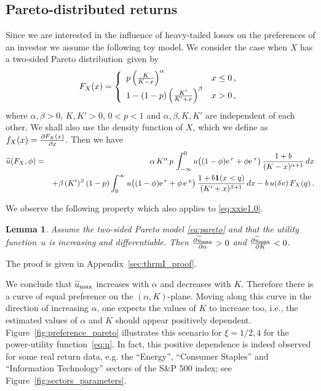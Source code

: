 \documentclass[11pt,a4]{amsart}
\newcommand{\pd}{\partial}
\newcommand{\ex}{{\rm e}\,}
\newtheorem{lemma}{Lemma}[section]
\newcommand{\ble}{\begin{lemma}}
\newcommand{\ele}{\end{lemma}}
\newcommand{\beam}{\begin{eqnarray}}
\newcommand{\eeam}{\end{eqnarray}\noindent}
\newcommand{\wt}{\widetilde}
\newcommand{\fct}{function}
\newcommand{\ds}{distribution}
\newcommand{\1}{{\mathbf 1}}
\begin{document}
\subsection{Pareto-distributed returns}\label{sec:pareto_tail}
Since we are interested in the influence of heavy-tailed losses on the preferences of an investor 
we assume the following toy model. 
We consider the case when $X$ has a two-sided Pareto \ds\ given by
\beam\label{eq:pareto}
  F_X(x) = \left\{
  \begin{array}{ll}
    p \left(
    {K \over K - x}
    \right)^\alpha & x \leq 0 \,,\\
    1 - (1 - p) \left(
    {K' \over K' + x}
    \right)^\beta & x > 0\,,
  \end{array}
  \right.
\eeam
where
$\alpha, \beta > 0$, $K,K' > 0$, $0 < p < 1$ and
$\alpha, \beta, K, K'$ are independent of each other. We shall also
use the density function of $X$, which we define as
$f_X(x) = {\pd F_X(x) \over \pd x}$.
Then we have
\beam\label{eq:xxie1.0}
 \wt u(F_X, \phi)\nonumber
  &=&
  \alpha\, K^\alpha\,  p\,
  \int_{-\infty}^0
  u\big( (1 - \phi) \ex^r + \phi \ex^x \big)\,
  {1 + b \over (K - x)^{\alpha + 1}} \,dx\\
    &&+
  \beta \,(K')^\beta\, (1 - p)
  \int_{0}^\infty
  u\big( (1 - \phi) \ex^r + \phi\, \ex^x \big)\,
  {1 + b \1(x <  q) \over (K' + x)^{\beta + 1}} \,dx 
  - b \,u(\delta v) \,F_X(q) \,.\label{eq:pp}
\eeam
\par
We observe the following property which also applies to \eqref{eq:xxie1.0}. 
\ble\label{thrm:I}
 Assume the two-sided Pareto model \eqref{eq:pareto} and that the utility
 \fct\ $u$ is increasing and differentiable. Then $\frac{\pd \wt
   u_{\rm max}}{\pd \alpha} > 0$ and $\frac{\pd \wt u_{\rm max}}{\pd
   K} < 0$.
\ele
The proof is given in Appendix~\ref{sec:thrmI_proof}. 
\par
We conclude that
$\wt u_{\rm max}$ increases with $\alpha$ and decreases with
$K$. Therefore there is a curve of  equal preference on the $(\alpha,
K)$-plane. Moving along this curve in the direction of increasing
$\alpha$, one expects the values of $K$ to increase too, i.e., the
estimated values of $\alpha$ and $K$ 
should appear positively dependent. Figure~\ref{fig:preference_pareto}
illustrates this scenario for $\xi = 1/2, 4$ for the power-utility
\fct\ \eqref{eq:u}.
In fact, this positive dependence is indeed observed for some
real return data, e.g. the ``Energy'', ``Consumer Staples'' and
``Information Technology'' sectors of the S\&P 500 index; see 
Figure~\ref{fig:sectors_parameters}.
\end{document}
